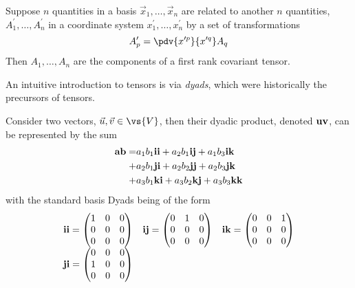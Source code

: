 \begin{definition}
  Suppose $n$ quantities in a basis $\vec{x}_{1}, \dots, \vec{x}_n$ are
  related to another $n$ quantities, $A^{\prime}_1, \dots,
  A^{\prime}_n$ in a coordinate system $x^{\prime}_1, \dots,
  x^{\prime}_n$ by a set of transformations
  \[ A^{\prime}_p = \pdv{x^{\prime p}}{x^{\prime q}} A_q \] Then $A_1,
  \dots, A_n$ are the components of a first rank covariant tensor.
\end{definition}
An intuitive introduction to tensors is via \emph{dyads}, which were
historically the precursors of tensors. 
\begin{definition}
  Consider two vectors, $\vec{u}, \vec{v} \in \vs{V}$, then their
  dyadic product, denoted $\boldsymbol{\rm uv}$, can be represented by the
  sum 
  \begin{align*}
    \label{eq:dyadicproduct}
       \boldsymbol{\rm ab} =           & a_1 b_1 \boldsymbol{\rm ii} + a_2 b_1 \boldsymbol{\rm ij} + a_1 b_3 \boldsymbol{\rm ik} \\ 
       +                     & a_2 b_1 \boldsymbol{\rm ji} + a_2 b_2 \boldsymbol{\rm jj} + a_2 b_3 \boldsymbol{\rm jk} \\ 
       +                     & a_3 b_1 \boldsymbol{\rm ki} + a_3 b_2 \boldsymbol{\rm kj} + a_3 b_3 \boldsymbol{\rm kk}
  \end{align*}
with the standard basis Dyads being of the form
\begin{equation*} 
\begin{matrix}
\boldsymbol{\rm ii} =\begin{pmatrix} 1 & 0 & 0                                                     \\ 0 & 0 & 0 \\ 0 & 0 & 0 \end{pmatrix} & 
\boldsymbol{\rm ij} =\begin{pmatrix} 0 & 1 & 0                                                     \\ 0 & 0 & 0 \\ 0 & 0 & 0 \end{pmatrix} & 
\boldsymbol{\rm ik} =\begin{pmatrix} 0 & 0 & 1                                                     \\ 0 & 0 & 0 \\ 0 & 0 & 0 \end{pmatrix} \\
\boldsymbol{\rm ji} =\begin{pmatrix} 0 & 0 & 0                                                     \\ 1 & 0 & 0 \\ 0 & 0 & 0 \end{pmatrix} & 

\end{matrix}
\end{equation*}
\end{definition}
